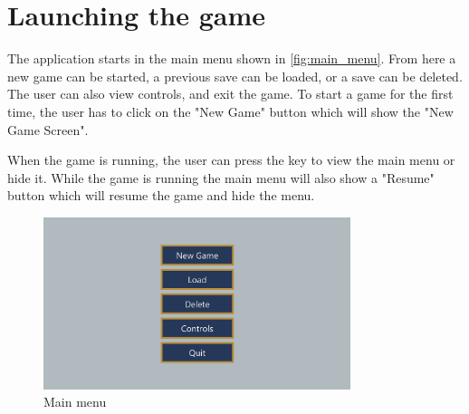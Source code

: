 \section{Launching the game}
The application starts in the main menu shown in \autoref{fig:main_menu}.
From here a new game can be started, a previous save can be loaded, or a save can be deleted.
The user can also view controls, and exit the game.
To start a game for the first time, the user has to click on the "New Game" button which will show the "New Game Screen".

When the game is running, the user can press the \keys{\escwin} key to view the main menu or hide it.
While the game is running the main menu will also show a "Resume" button which will resume the game and hide the menu.

\begin{figure}[h]
    \centering
    \includegraphics[width=0.8\textwidth]{chapters/user_manual/resources/main-menu.png}
    \caption{Main menu}
    \label{fig:main_menu}
\end{figure}